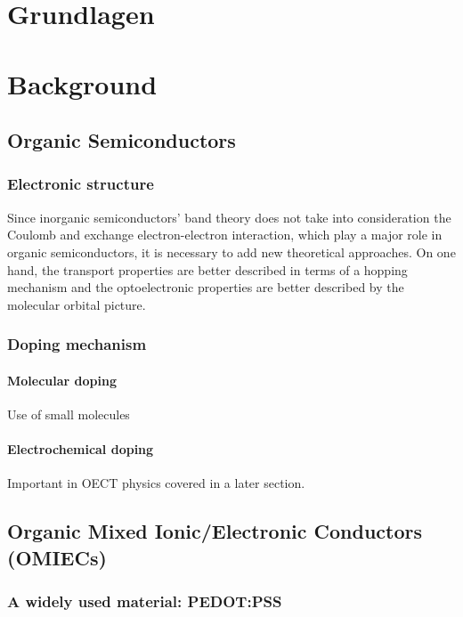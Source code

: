 {\chapter{Grundlagen}}
{\chapter{Background}}
\label{sec:background}

\section{Organic Semiconductors}

\subsection{Electronic structure}
Since inorganic semiconductors' band theory does not take into consideration the Coulomb and exchange electron-electron interaction, which play a major role in organic semiconductors, it is necessary to add new theoretical approaches. On one hand, the transport properties are better described in terms of a hopping mechanism and the optoelectronic properties are better described by the molecular orbital picture. \nocite{alcacer_electronic_2018}

\subsection{Doping mechanism}
\subsubsection{Molecular doping}

Use of small molecules

\subsubsection{Electrochemical doping}

Important in OECT physics covered in a later section.


\section{Organic Mixed Ionic/Electronic Conductors (OMIECs)}
\subsection{A widely used material: PEDOT:PSS}

